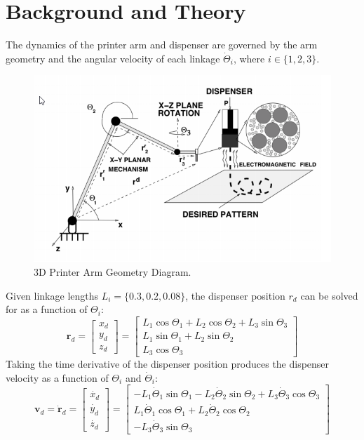 \documentclass[a4paper,12pt]{report}
\begin{document}
\section{Background and Theory}
The dynamics of the printer arm and dispenser are governed by the arm geometry and the angular velocity of each linkage $\dot{\Theta}_i$, where $i \in \{1, 2, 3\}$.
\begin{figure}[H]
\begin{nscenter}
  \includegraphics[width=0.75\linewidth]{arm_geom.png}
  \caption[test]{3D Printer Arm Geometry Diagram.\footnotemark}
  \end{nscenter}
\end{figure}
\noindent
Given linkage lengths $L_i = \{0.3, 0.2, 0.08\}$, the dispenser position $r_d$ can be solved for as a function of $\Theta_i$:
$$ \bm{r}_d =
\begin{bmatrix}
x_d \\
y_d \\
z_d
\end{bmatrix} = 
\begin{bmatrix}
L_1\cos{\Theta_1} + L_2\cos{\Theta_2} + L_3\sin{\Theta_3} \\
L_1\sin{\Theta_1} + L_2\sin{\Theta_2}\\
L_3\cos{\Theta_3}
\end{bmatrix} $$
Taking the time derivative of the dispenser position produces the dispenser velocity as a function of $\Theta_i$ and $\dot{\Theta}_i$:
$$ \bm{v}_d = \dot{\bm{r}}_d =
\begin{bmatrix}
\dot{x_d} \\
\dot{y_d} \\
\dot{z_d}
\end{bmatrix} = 
\begin{bmatrix}
-L_1\dot{\Theta}_1\sin{\Theta_1} - L_2\dot{\Theta}_2\sin{\Theta_2} + L_3\dot{\Theta}_3\cos{\Theta_3} \\
L_1\dot{\Theta}_1\cos{\Theta_1} + L_2\dot{\Theta}_2\cos{\Theta_2} \\
-L_3\dot{\Theta}_3\sin{\Theta_3}
\end{bmatrix}
$$
\end{document}

